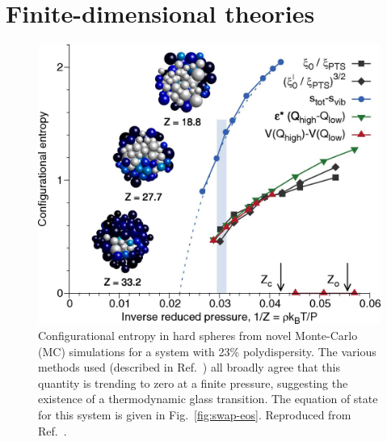 \documentclass[11pt,twoside]{report}
\begin{document}
\section{Finite-dimensional theories}

\begin{figure}
  \includegraphics[width=0.9\linewidth,outer]{swap-Sconf}
  \caption[Configurational entropy in hard spheres from Monte-Carlo simulations]{
    Configurational entropy in hard spheres from novel Monte-Carlo (MC) simulations for a system with 23\% polydispersity.
    The various methods used (described in Ref.\ \cite{BerthierPNAS2017}) all broadly agree that this quantity is trending to zero at a finite pressure, suggesting the existence of a thermodynamic glass transition.
    The equation of state for this system is given in Fig.\ \ref{fig:swap-eos}.
    Reproduced from Ref.\ \cite{BerthierPNAS2017}.
  }
  \label{fig:swap-sconf}
\end{figure}

\end{document}
